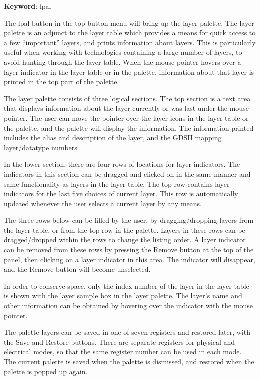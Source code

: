 {\bf Keyword}: {\vt lpal}

The {\cb lpal} button in the top button menu will bring up the layer
palette.  The layer palette is an adjunct to the layer table which
provides a means for quick access to a few ``important'' layers, and
prints information about layers.  This is particularly useful when
working with technologies containing a large number of layers, to
avoid hunting through the layer table.  When the mouse pointer hovers
over a layer indicator in the layer table or in the palette,
information about that layer is printed in the top part of the
palette.

The layer palette consists of three logical sections.  The top section
is a text area that displays information about the layer currently or
was last under the mouse pointer.  The user can move the pointer over
the layer icons in the layer table or the palette, and the palette
will display the information.  The information printed includes the
alias and description of the layer, and the GDSII mapping
layer/datatype numbers.

In the lower section, there are four rows of locations for layer
indicators.  The indicators in this section can be dragged and clicked
on in the same manner and same functionality as layers in the layer
table.  The top row contains layer indicators for the last five
choices of current layer.  This row is automatically updated whenever
the user selects a current layer by any means.

The three rows below can be filled by the user, by dragging/dropping
layers from the layer table, or from the top row in the palette. 
Layers in these rows can be dragged/dropped within the rows to change
the listing order.  A layer indicator can be removed from these rows
by pressing the {\cb Remove} button at the top of the panel, then
clicking on a layer indicator in this area.  The indicator will
disappear, and the {\cb Remove} button will become unselected.

In order to conserve space, only the index number of the layer in the
layer table is shown with the layer sample box in the layer palette. 
The layer's name and other information can be obtained by hovering
over the indicator with the mouse pointer.

The palette layers can be saved in one of seven registers and restored
later, with the {\cb Save} and {\cb Restore} buttons.  There are
separate registers for physical and electrical modes, so that the same
register number can be used in each mode.  The current palette is
saved when the palette is dismissed, and restored when the palette is
popped up again.


